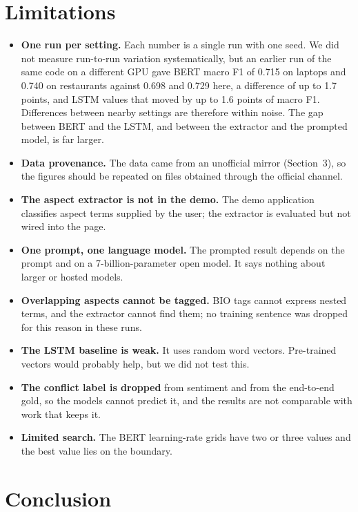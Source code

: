 \documentclass{nle}
\begin{document}
\section{Limitations}
\label{sec:limits}

\begin{itemize}
\item \textbf{One run per setting.} Each number is a single run with one seed. We did not measure run-to-run variation systematically, but an earlier run of the same code on a different GPU gave BERT macro F1 of 0.715 on laptops and 0.740 on restaurants against 0.698 and 0.729 here, a difference of up to 1.7 points, and LSTM values that moved by up to 1.6 points of macro F1. Differences between nearby settings are therefore within noise. The gap between BERT and the LSTM, and between the extractor and the prompted model, is far larger.
\item \textbf{Data provenance.} The data came from an unofficial mirror (Section~3), so the figures should be repeated on files obtained through the official channel.
\item \textbf{The aspect extractor is not in the demo.} The demo application classifies aspect terms supplied by the user; the extractor is evaluated but not wired into the page.
\item \textbf{One prompt, one language model.} The prompted result depends on the prompt and on a 7-billion-parameter open model. It says nothing about larger or hosted models.
\item \textbf{Overlapping aspects cannot be tagged.} BIO tags cannot express nested terms, and the extractor cannot find them; no training sentence was dropped for this reason in these runs.
\item \textbf{The LSTM baseline is weak.} It uses random word vectors. Pre-trained vectors would probably help, but we did not test this.
\item \textbf{The conflict label is dropped} from sentiment and from the end-to-end gold, so the models cannot predict it, and the results are not comparable with work that keeps it.
\item \textbf{Limited search.} The BERT learning-rate grids have two or three values and the best value lies on the boundary.
\end{itemize}

\section{Conclusion}
\end{document}
